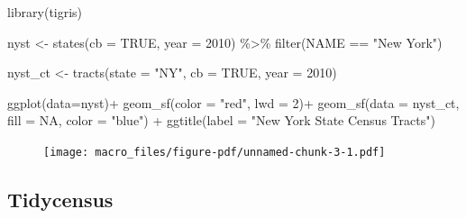\documentclass[
  letterpaper,
  DIV=11,
  numbers=noendperiod]{scrreprt}
\newenvironment{Shaded}{\begin{snugshade}}{\end{snugshade}}
\newcommand{\AttributeTok}[1]{\textcolor[rgb]{0.40,0.45,0.13}{#1}}
\newcommand{\ConstantTok}[1]{\textcolor[rgb]{0.56,0.35,0.01}{#1}}
\newcommand{\DecValTok}[1]{\textcolor[rgb]{0.68,0.00,0.00}{#1}}
\newcommand{\FunctionTok}[1]{\textcolor[rgb]{0.28,0.35,0.67}{#1}}
\newcommand{\NormalTok}[1]{\textcolor[rgb]{0.00,0.23,0.31}{#1}}
\newcommand{\OtherTok}[1]{\textcolor[rgb]{0.00,0.23,0.31}{#1}}
\newcommand{\SpecialCharTok}[1]{\textcolor[rgb]{0.37,0.37,0.37}{#1}}
\newcommand{\StringTok}[1]{\textcolor[rgb]{0.13,0.47,0.30}{#1}}
\begin{document}
\begin{Shaded}
\begin{Highlighting}[]
\FunctionTok{library}\NormalTok{(tigris)}

\NormalTok{nyst }\OtherTok{\textless{}{-}} \FunctionTok{states}\NormalTok{(}\AttributeTok{cb =} \ConstantTok{TRUE}\NormalTok{,}
               \AttributeTok{year =} \DecValTok{2010}\NormalTok{) }\SpecialCharTok{\%\textgreater{}\%}
  \FunctionTok{filter}\NormalTok{(NAME }\SpecialCharTok{==} \StringTok{"New York"}\NormalTok{)}

\NormalTok{nyst\_ct }\OtherTok{\textless{}{-}} \FunctionTok{tracts}\NormalTok{(}\AttributeTok{state =} \StringTok{"NY"}\NormalTok{,}
                  \AttributeTok{cb =} \ConstantTok{TRUE}\NormalTok{,}
                  \AttributeTok{year =} \DecValTok{2010}\NormalTok{)}

\FunctionTok{ggplot}\NormalTok{(}\AttributeTok{data=}\NormalTok{nyst)}\SpecialCharTok{+}
  \FunctionTok{geom\_sf}\NormalTok{(}\AttributeTok{color =} \StringTok{"red"}\NormalTok{, }
          \AttributeTok{lwd =} \DecValTok{2}\NormalTok{)}\SpecialCharTok{+}
   \FunctionTok{geom\_sf}\NormalTok{(}\AttributeTok{data =}\NormalTok{ nyst\_ct,}
           \AttributeTok{fill =} \ConstantTok{NA}\NormalTok{,}
           \AttributeTok{color =} \StringTok{"blue"}\NormalTok{) }\SpecialCharTok{+} 
  \FunctionTok{ggtitle}\NormalTok{(}\AttributeTok{label =} \StringTok{"New York State Census Tracts"}\NormalTok{)}
\end{Highlighting}
\end{Shaded}

\begin{figure}[H]

{\centering \texttt{[image: macro\_files/figure-pdf/unnamed-chunk-3-1.pdf]}

}

\end{figure}

\hypertarget{tidycensus}{%
\subsection{Tidycensus}\label{tidycensus}}
\end{document}
